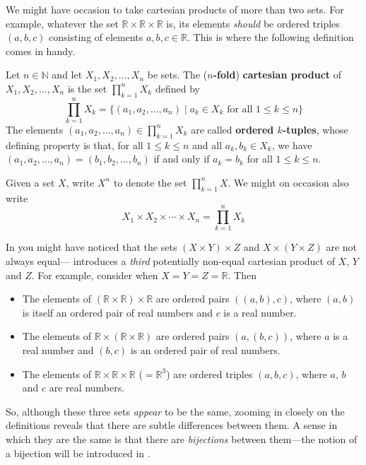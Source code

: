 We might have occasion to take cartesian products of more than two sets. For example, whatever the set $\mathbb{R} \times \mathbb{R} \times \mathbb{R}$ is, its elements \textit{should} be ordered triples $(a,b,c)$ consisting of elements $a,b,c \in \mathbb{R}$. This is where the following definition comes in handy.

\begin{definition}
\label{defCartesianProductNFold}
Let $n \in \mathbb{N}$ and let $X_1, X_2, \dots, X_n$ be sets. The (\textbf{$n$-fold}) \textbf{cartesian product} of $X_1, X_2, \dots, X_n$ is the set $\prod_{k=1}^n X_k$  defined by
\[ \prod_{k=1}^n X_k = \{ (a_1, a_2, \dots, a_n) \mid a_k \in X_k \text{ for all } 1 \le k \le n \} \]
The elements $(a_1, a_2, \dots, a_n) \in \prod_{k=1}^n X_k$ are called \textbf{ordered $k$-tuples}, whose defining property is that, for all $1 \le k \le n$ and all $a_k,b_k \in X_k$, we have $(a_1, a_2, \dots, a_n) = (b_1, b_2, \dots, b_n)$ if and only if $a_k = b_k$ for all $1 \le k \le n$.

Given a set $X$, write $X^n$ to denote the set $\prod_{k=1}^n X$. We might on occasion also write
\[ X_1 \times X_2 \times \cdots \times X_n = \prod_{k=1}^n X_k \]
\end{definition}

\begin{example}
In  you might have noticed that the sets $(X \times Y) \times Z$ and $X \times (Y \times Z)$ are not always equal--- introduces a \textit{third} potentially non-equal cartesian product of $X$, $Y$ and $Z$. For example, consider when $X=Y=Z=\mathbb{R}$. Then
\begin{itemize}
\item The elements of $(\mathbb{R} \times \mathbb{R}) \times \mathbb{R}$ are ordered pairs $((a,b),c)$, where $(a,b)$ is itself an ordered pair of real numbers and $c$ is a real number.
\item The elements of $\mathbb{R} \times (\mathbb{R} \times \mathbb{R})$ are ordered pairs $(a,(b,c))$, where $a$ is a real number and $(b,c)$ is an ordered pair of real numbers.
\item The elements of $\mathbb{R} \times \mathbb{R} \times \mathbb{R}$ ($=\mathbb{R}^3$) are ordered triples $(a,b,c)$, where $a$, $b$ and $c$ are real numbers.
\end{itemize}
So, although these three sets \textit{appear} to be the same, zooming in closely on the definitions reveals that there are subtle differences between them. A sense in which they are the same is that there are \textit{bijections} between them---the notion of a bijection will be introduced in .
\end{example}